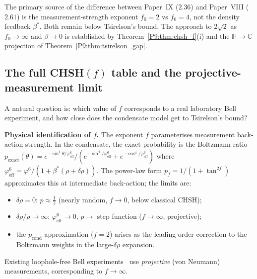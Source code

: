 \documentclass[11pt,a4paper]{article}
\theoremstyle{definition}
\theoremstyle{remark}
\newcommand{\vp}{\varphi}
\newcommand{\bst}{\beta^{*}}
\newcommand{\CC}{\mathbb{C}}
\newcommand{\HH}{\mathbb{H}}
\newcommand{\pcond}{p_{\mathrm{cond}}}
\begin{document}
The primary source of the difference between Paper~IX ($2.36$) and
Paper~VIII ($2.61$) is the measurement-strength exponent $f_0=2$ vs $f_0=4$,
not the density feedback $\beta^*$.
Both remain below Tsirelson's bound.
The approach to $2\sqrt{2}$ as $f_0\to\infty$ and $\beta\to0$ is
established by Theorem~\ref{P9:thm:chsh_f}(i) and the $\HH\to\CC$
projection of Theorem~\ref{P9:thm:tsirelson_gap}.
 
\subsection{The full CHSH$(f)$ table and the projective-measurement limit}
\label{P9:sec:chsh_table}
 
A natural question is: which value of $f$ corresponds to a real
laboratory Bell experiment, and how close does the condensate model
get to Tsirelson's bound?
 
\textbf{Physical identification of $f$.}
The exponent $f$ parameterises measurement back-action strength.
In the condensate, the exact probability is the Boltzmann ratio
$p_\mathrm{exact}(\theta) = e^{-\sin^4\!\theta/\vp^6_\mathrm{eff}}/
(e^{-\sin^4\!/\vp^6_\mathrm{eff}}+e^{-\cos^4\!/\vp^6_\mathrm{eff}})$
where $\vp^6_\mathrm{eff}=\vp^6/(1+\bst(\rho+\delta\rho))$.
The power-law form $p_f=1/(1+\tan^{2f})$ approximates this at
intermediate back-action; the limits are:
\begin{itemize}[noitemsep]
\item $\delta\rho=0$: $p\approx\tfrac{1}{2}$ (nearly random,
  $f\to 0$, below classical CHSH);
\item $\delta\rho/\rho\to\infty$: $\vp^6_\mathrm{eff}\to0$,
  $p\to$ step function ($f\to\infty$, projective);
\item the $\pcond$ approximation ($f=2$) arises as the leading-order
  correction to the Boltzmann weights in the large-$\delta\rho$ expansion.
\end{itemize}
Existing loophole-free Bell experiments~\cite{Hensen2015} use
\emph{projective} (von Neumann) measurements, corresponding to $f\to\infty$.
 
\end{document}
